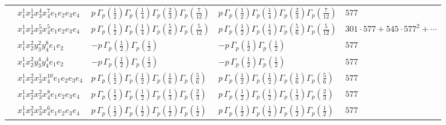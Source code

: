 \documentclass[11pt]{article}
\begin{document}
\begin{table}[ht]
{\begin{tabular}{@{}lllll@{}}
 & $x_{1}^{1} x_{2}^{1} x_{3}^{4} x_{4}^{7}  e_{1} e_{2} e_{3} e_{4}$ & $p \, \Gamma_p \left( \frac{1}{2} \right) \Gamma_p \left( \frac{1}{4} \right) \Gamma_p \left( \frac{2}{3} \right) \Gamma_p \left( \frac{7}{12} \right)$ & $p \, \Gamma_p \left( \frac{1}{2} \right) \Gamma_p \left( \frac{1}{4} \right) \Gamma_p \left( \frac{2}{3} \right) \Gamma_p \left( \frac{7}{12} \right)$ & $577$ \\
 & $x_{1}^{1} x_{2}^{1} x_{3}^{5} x_{4}^{5}  e_{1} e_{2} e_{3} e_{4}$ & $p \, \Gamma_p \left( \frac{1}{2} \right) \Gamma_p \left( \frac{1}{4} \right) \Gamma_p \left( \frac{5}{6} \right) \Gamma_p \left( \frac{5}{12} \right)$ & $p \, \Gamma_p \left( \frac{1}{2} \right) \Gamma_p \left( \frac{1}{4} \right) \Gamma_p \left( \frac{5}{6} \right) \Gamma_p \left( \frac{5}{12} \right)$ & $301{\cdot}577{+}545{\cdot}577^{2}{+}\cdots$ \\
 & $x_{1}^{1} x_{2}^{2} y_{3}^{2} y_{4}^{8} e_{1} e_{2}$ & $- p \, \Gamma_p \left( \frac{1}{2} \right) \Gamma_p \left( \frac{1}{2} \right)$ & $- p \, \Gamma_p \left( \frac{1}{2} \right) \Gamma_p \left( \frac{1}{2} \right)$ & $577$ \\
 & $x_{1}^{1} x_{2}^{2} y_{3}^{4} y_{4}^{4} e_{1} e_{2}$ & $- p \, \Gamma_p \left( \frac{1}{2} \right) \Gamma_p \left( \frac{1}{2} \right)$ & $- p \, \Gamma_p \left( \frac{1}{2} \right) \Gamma_p \left( \frac{1}{2} \right)$ & $577$ \\
 & $x_{1}^{1} x_{2}^{2} x_{3}^{1} x_{4}^{10}  e_{1} e_{2} e_{3} e_{4}$ & $p \, \Gamma_p \left( \frac{1}{2} \right) \Gamma_p \left( \frac{1}{2} \right) \Gamma_p \left( \frac{1}{6} \right) \Gamma_p \left( \frac{5}{6} \right)$ & $p \, \Gamma_p \left( \frac{1}{2} \right) \Gamma_p \left( \frac{1}{2} \right) \Gamma_p \left( \frac{1}{6} \right) \Gamma_p \left( \frac{5}{6} \right)$ & $577$ \\
 & $x_{1}^{1} x_{2}^{2} x_{3}^{2} x_{4}^{8}  e_{1} e_{2} e_{3} e_{4}$ & $p \, \Gamma_p \left( \frac{1}{2} \right) \Gamma_p \left( \frac{1}{2} \right) \Gamma_p \left( \frac{1}{3} \right) \Gamma_p \left( \frac{2}{3} \right)$ & $p \, \Gamma_p \left( \frac{1}{2} \right) \Gamma_p \left( \frac{1}{2} \right) \Gamma_p \left( \frac{1}{3} \right) \Gamma_p \left( \frac{2}{3} \right)$ & $577$ \\
 & $x_{1}^{1} x_{2}^{2} x_{3}^{3} x_{4}^{6}  e_{1} e_{2} e_{3} e_{4}$ & $p \, \Gamma_p \left( \frac{1}{2} \right) \Gamma_p \left( \frac{1}{2} \right) \Gamma_p \left( \frac{1}{2} \right) \Gamma_p \left( \frac{1}{2} \right)$ & $p \, \Gamma_p \left( \frac{1}{2} \right) \Gamma_p \left( \frac{1}{2} \right) \Gamma_p \left( \frac{1}{2} \right) \Gamma_p \left( \frac{1}{2} \right)$ & $577$ \\

\end{tabular}}
\end{table}
\end{document}
